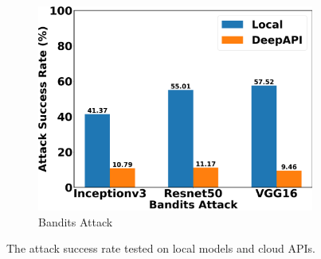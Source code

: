 \begin{figure}[tbp]
\begin{subfigure}[b]{0.32\textwidth}
    \centering
    \includegraphics[width=\textwidth]{figures/chapter_classification/bandits_attack_success_rate.png}
    \caption{Bandits Attack}
    \label{fig:bandits_suc}
\end{subfigure}
\caption{The attack success rate tested on local models and cloud APIs.}
\label{fig.suc}
\end{figure}

